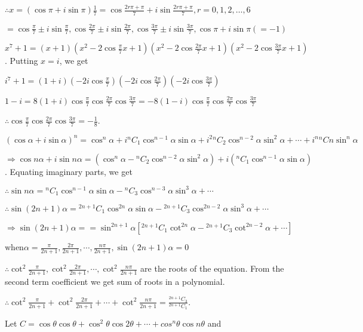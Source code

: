   $\therefore x = \left(\cos\pi + i \sin\pi\right)\frac{1}{7} =
  \cos\frac{2r\pi + \pi}{7} + i \sin \frac{2r\pi + \pi}{7}, r = 0, 1, 2,
  \ldots, 6$

  $= \cos \frac{\pi}{7} \pm i \sin\frac{\pi}{7}, \cos \frac{2\pi}{7} \pm i
  \sin\frac{2\pi}{7}, \cos \frac{3\pi}{7} \pm i \sin\frac{3\pi}{7}, \cos
  \pi + i \sin \pi(= -1)$

  $x^7 + 1 = (x + 1)\left(x^2 - 2\cos\frac{\pi}{7}x + 1\right)\left(x^2 -
  2\cos\frac{2\pi}{7}x + 1\right)\left(x^2 - 2\cos\frac{3\pi}{7}x +
  1\right)$. Putting $x = i$, we get

  $i^7 + 1 = (1 +
  i)\left(-2i\cos\frac{\pi}{7}\right)\left(-2i\cos\frac{2\pi}{7}\right)\left(-2i\cos\frac{3\pi}{7}\right)$

  $1 - i = 8(1 + i)\cos\frac{\pi}{7}\cos\frac{2\pi}{7}\cos\frac{3\pi}{7} = -8(1 -
  i)\cos\frac{\pi}{7}\cos\frac{2\pi}{7}\cos\frac{3\pi}{7}$

  $\therefore \cos\frac{\pi}{7}\cos\frac{2\pi}{7}\cos\frac{3\pi}{7} = -\frac{1}{8}$.
\item $(\cos\alpha + i \sin\alpha)^n = \cos^n\alpha + i{^nC_1}\cos^{n-1}\alpha
  \sin\alpha + i^2{^nC_2}\cos^{n-2}\alpha \sin^2\alpha + \cdots +
  i^n{^nCn}\sin^n\alpha$

  $\Rightarrow \cos n\alpha + i \sin n\alpha = (\cos^n\alpha -
  {^nC_2}\cos^{n-2}\alpha \sin^2\alpha) + i({^nC_1}\cos^{n-1}\alpha
  \sin\alpha)$. Equating imaginary parts, we get

  $\therefore \sin n\alpha = {^nC_1}\cos^{n-1}\alpha \sin\alpha - {}^nC_3\cos^{n-3}\alpha \sin^3\alpha +
  \cdots$

  $\therefore \sin (2n+1)\alpha = {}^{2n+1}C_1\cos^{2n}\alpha \sin\alpha - {}^{2n+1}C_3\cos^{2n-2}\alpha
  \sin^3\alpha + \cdots$

  $\Rightarrow \sin (2n+1)\alpha = = \sin^{2n+1}\alpha[{^{2n+1}C_1\cot^{2n}}\alpha -
    {}^{2n+1}C_3\cot^{2n-2}\alpha + \cdots]$

  $\text{when} \alpha = \frac{\pi}{2n+1}, \frac{2\pi}{2n+1}, \cdots, \frac{n\pi}{2n+1}, \sin(2n+1)\alpha =
  0$

  $\therefore \cot^2\frac{\pi}{2n+1}, \cot^2\frac{2\pi}{2n+1}, \cdots, \cot^2\frac{n\pi}{2n+1}$ are the
  roots of the equation. From the second term coefficient we get sum of roots in a polynomial.

  $\therefore \cot^2\frac{\pi}{2n+1}+ \cot^2\frac{2\pi}{2n+1}+ \cdots+ \cot^2\frac{n\pi}{2n+1} =
  \frac{{}^{2n+1}C_3}{{}^{2n+1}C_1}$.
\item Let $C = \cos\theta \cos\theta + \cos^2\theta \cos 2\theta + \cdots + cos^n\theta \cos n\theta$
  and

